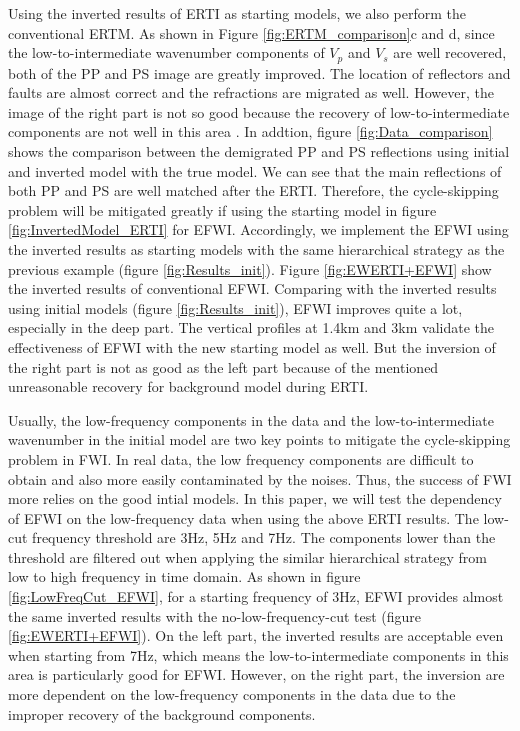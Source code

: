Using the inverted results of ERTI as starting models, we also perform the conventional ERTM. 
As shown in Figure \ref{fig:ERTM_comparison}c and d, 
since the low-to-intermediate wavenumber components of $V_p$ and $V_s$ are well recovered,
both of the PP and PS image are greatly improved. The location of reflectors and faults are almost correct and the
refractions are migrated as well. 
However, the image of the right part is not so good because the
recovery of low-to-intermediate components are not well in this area .
In addtion, figure \ref{fig:Data_comparison} shows the comparison between the demigrated PP and PS
reflections using initial and inverted model with
the true model. We can see that the main reflections of both PP and PS are well matched after the
ERTI. Therefore, the cycle-skipping problem will be mitigated greatly if using the starting model in
figure \ref{fig:InvertedModel_ERTI} for EFWI.
Accordingly, we implement the EFWI using the inverted results as starting models with the same
hierarchical strategy as the previous example (figure \ref{fig:Results_init}).
Figure
\ref{fig:EWERTI+EFWI} show the inverted results of conventional EFWI. Comparing with the 
inverted results using initial models (figure \ref{fig:Results_init}), EFWI improves quite a lot,
especially in the deep part. The vertical profiles at 1.4km and 3km validate the effectiveness of
EFWI with the new starting model as well. But the inversion of the right part is not as good as the
left part because of the mentioned unreasonable recovery for background model during ERTI.

Usually, the low-frequency components in the data and the low-to-intermediate wavenumber in the
initial model are two key points to mitigate the cycle-skipping problem in FWI. In real data, the
low frequency components are difficult to obtain and also more easily contaminated by the noises.
Thus, the success of FWI more relies on the good intial models. 
In this paper, we will test the dependency of EFWI on 
the low-frequency data when using the above ERTI results. 
The low-cut frequency threshold are 3Hz,
5Hz and 7Hz. The components lower than the threshold are filtered out when applying the similar
hierarchical strategy from low to high frequency in time domain.
As shown in figure \ref{fig:LowFreqCut_EFWI}, for a starting frequency of 3Hz, EFWI provides almost the same inverted results with
the no-low-frequency-cut test (figure \ref{fig:EWERTI+EFWI}). 
On the left part, the inverted results are acceptable even when starting from 7Hz, which means the
low-to-intermediate components in this area is particularly good for EFWI. However, on the right
part, the inversion are more dependent on the low-frequency components in the data due to the
improper recovery of the background components.
